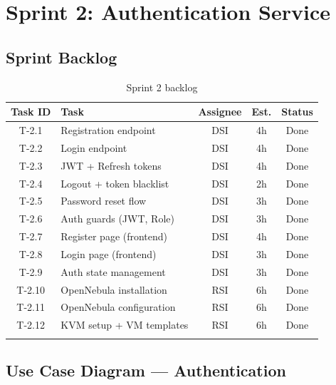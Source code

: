 \section{Sprint 2: Authentication Service}


\subsection{Sprint Backlog}

\begin{longtable}{|c|p{5cm}|c|c|c|}
\hline
\rowcolor{blue!15}
\textbf{Task ID} & \textbf{Task} & \textbf{Assignee} & \textbf{Est.} & \textbf{Status} \\
\hline
\endhead
T-2.1 & Registration endpoint & DSI & 4h & Done \\
\hline
T-2.2 & Login endpoint & DSI & 4h & Done \\
\hline
T-2.3 & JWT + Refresh tokens & DSI & 4h & Done \\
\hline
T-2.4 & Logout + token blacklist & DSI & 2h & Done \\
\hline
T-2.5 & Password reset flow & DSI & 3h & Done \\
\hline
T-2.6 & Auth guards (JWT, Role) & DSI & 3h & Done \\
\hline
T-2.7 & Register page (frontend) & DSI & 4h & Done \\
\hline
T-2.8 & Login page (frontend) & DSI & 3h & Done \\
\hline
T-2.9 & Auth state management & DSI & 3h & Done \\
\hline
T-2.10 & OpenNebula installation & RSI & 6h & Done \\
\hline
T-2.11 & OpenNebula configuration & RSI & 6h & Done \\
\hline
T-2.12 & KVM setup + VM templates & RSI & 6h & Done \\
\hline
\caption{Sprint 2 backlog}
\label{tab:sprint2-backlog}
\end{longtable}

\subsection{Use Case Diagram — Authentication}

